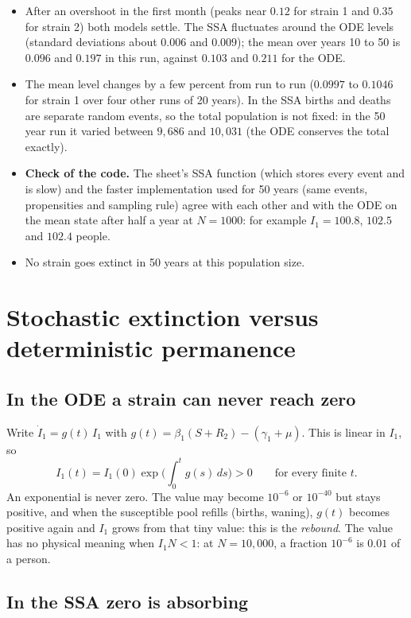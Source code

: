\documentclass[11pt,a4paper]{article}
\begin{document}
\begin{itemize}
  \item After an overshoot in the first month (peaks near $0.12$ for strain 1 and $0.35$ for strain 2) both models settle. The SSA fluctuates around the ODE levels (standard deviations about $0.006$ and $0.009$); the mean over years 10 to 50 is $0.096$ and $0.197$ in this run, against $0.103$ and $0.211$ for the ODE.
  \item The mean level changes by a few percent from run to run ($0.0997$ to $0.1046$ for strain 1 over four other runs of 20 years). In the SSA births and deaths are separate random events, so the total population is not fixed: in the 50 year run it varied between $9{,}686$ and $10{,}031$ (the ODE conserves the total exactly).
  \item \textbf{Check of the code.} The sheet's SSA function (which stores every event and is slow) and the faster implementation used for 50 years (same events, propensities and sampling rule) agree with each other and with the ODE on the mean state after half a year at $N=1000$: for example $I_1=100.8$, $102.5$ and $102.4$ people.
  \item No strain goes extinct in 50 years at this population size.
\end{itemize}

\section{Stochastic extinction versus deterministic permanence}\label{sec:zero}

\subsection{In the ODE a strain can never reach zero}

Write $\dot I_1=g(t)\,I_1$ with $g(t)=\beta_1(S+R_2)-(\gamma_1+\mu)$. This is linear in $I_1$, so
\[
I_1(t)=I_1(0)\exp\Big(\int_0^t g(s)\,ds\Big)>0\qquad\text{for every finite }t .
\]
An exponential is never zero. The value may become $10^{-6}$ or $10^{-40}$ but stays positive, and when the susceptible pool refills (births, waning), $g(t)$ becomes positive again and $I_1$ grows from that tiny value: this is the \emph{rebound}. The value has no physical meaning when $I_1N<1$: at $N=10{,}000$, a fraction $10^{-6}$ is $0.01$ of a person.

\subsection{In the SSA zero is absorbing}
\end{document}
